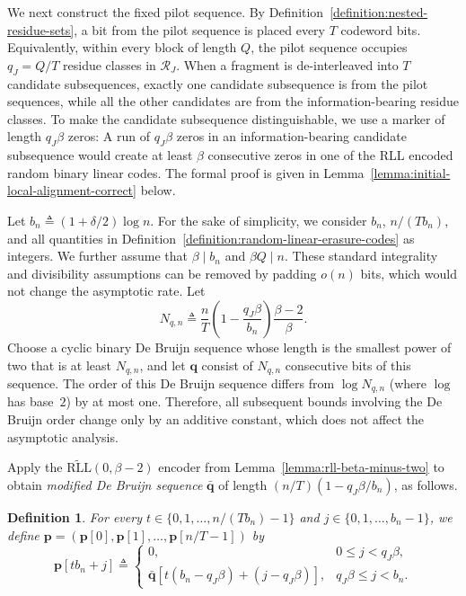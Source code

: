 \documentclass[journal,letterpaper,onecolumn,11pt]{IEEEtran}
\newcommand{\cR}{\mathcal{R}}
\newcommand{\boldp}{\mathbf{p}}
\newcommand{\boldq}{\mathbf{q}}
\newtheorem{definition}{Definition}
\begin{document}
We next construct the fixed pilot sequence.
By Definition~\ref{definition:nested-residue-sets}, a bit from the pilot sequence is placed every $T$ codeword bits. 
Equivalently, within every block of length $Q$, the pilot sequence occupies $q_J=Q/T$ residue classes in $\cR_J$.
When a fragment is de-interleaved into $T$ candidate subsequences, exactly one candidate subsequence is from the pilot sequences, while all the other candidates are from the information-bearing residue classes.
To make the candidate subsequence distinguishable, we use a marker of length $q_J\beta$ zeros: A run of \(q_J\beta\) zeros in an information-bearing candidate subsequence would create at least \(\beta\) consecutive zeros in one of the RLL encoded random binary linear codes.
The formal proof is given in Lemma~\ref{lemma:initial-local-alignment-correct} below.

Let \(b_n\triangleq(1+\delta/2)\log n\).
For the sake of simplicity, we consider \(b_n\), \(n/(Tb_n)\), and all
quantities in Definition~\ref{definition:random-linear-erasure-codes} as
integers.
We further assume that \(\beta\mid b_n\) and \(\beta Q\mid n\).
These standard integrality and divisibility assumptions can be removed
by padding \(o(n)\) bits, which would not change the asymptotic rate.
Let
\[
N_{q,n}\triangleq
\frac{n}{T}\left(1-\frac{q_J\beta}{b_n}\right)
\frac{\beta-2}{\beta}.
\]
Choose a cyclic binary De Bruijn sequence whose length is the smallest
power of two that is at least \(N_{q,n}\), and let \(\boldq\) consist
of \(N_{q,n}\) consecutive bits of this sequence.
The order of this De Bruijn sequence differs from
\(\log N_{q,n}\) (where $\log$ has base~$2$) by at most one. Therefore, all subsequent bounds
involving the De Bruijn order change only by an additive constant,
which does not affect the asymptotic analysis.

Apply the $\widetilde{\mathrm{RLL}}(0,\beta-2)$ encoder from Lemma~\ref{lemma:rll-beta-minus-two} to obtain \textit{modified De Bruijn sequence} $\bar{\boldq}$ of length $(n/T)(1-q_J\beta/b_n)$, as follows.

\begin{definition}\label{definition:modified-pilot}
For every $t\in\{0,1,\ldots,n/(Tb_n)-1\}$ and $j\in\{0,1,\ldots,b_n-1\}$, we define $\boldp=(\boldp[0],\boldp[1],\ldots,\boldp[n/T-1])$ by 
\[
\boldp[tb_n+j]\triangleq
\begin{cases}
0, & 0\leq j<q_J\beta,\\
\bar{\boldq}[t(b_n-q_J\beta)+(j-q_J\beta)], & q_J\beta\leq j<b_n.
\end{cases}
\]
\end{definition}
\end{document}

